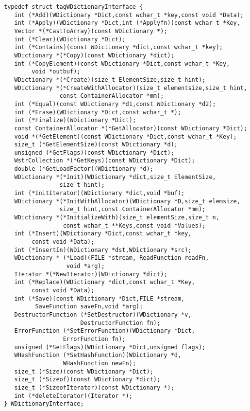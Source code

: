 \begin{verbatim}
typedef struct tagWDictionaryInterface {
   int (*Add)(WDictionary *Dict,const wchar_t *key,const void *Data);
   int (*Apply)(WDictionary *Dict,int (*Applyfn)(const wchar_t *Key,
   Vector *(*CastToArray)(const WDictionary *);
   int (*Clear)(WDictionary *Dict);
   int (*Contains)(const WDictionary *dict,const wchar_t *key);
   WDictionary *(*Copy)(const WDictionary *dict);
   int (*CopyElement)(const WDictionary *Dict,const wchar_t *Key,
        void *outbuf);
   WDictionary *(*Create)(size_t ElementSize,size_t hint);
   WDictionary *(*CreateWithAllocator)(size_t elementsize,size_t hint,
                const ContainerAllocator *mm);
   int (*Equal)(const WDictionary *d1,const WDictionary *d2);
   int (*Erase)(WDictionary *Dict,const wchar_t *);
   int (*Finalize)(WDictionary *Dict);
   const ContainerAllocator *(*GetAllocator)(const WDictionary *Dict);
   void *(*GetElement)(const WDictionary *Dict,const wchar_t *Key);
   size_t (*GetElementSize)(const WDictionary *d);
   unsigned (*GetFlags)(const WDictionary *Dict);
   WstrCollection *(*GetKeys)(const WDictionary *Dict);
   double (*GetLoadFactor)(WDictionary *d);
   WDictionary *(*Init)(WDictionary *dict,size_t ElementSize,
                size_t hint);
   int (*InitIterator)(WDictionary *dict,void *buf);
   WDictionary *(*InitWithAllocator)(WDictionary *D,size_t elemsize,
                size_t hint,const ContainerAllocator *mm);
   WDictionary *(*InitializeWith)(size_t elementSize,size_t n,
                 const wchar_t **Keys,const void *Values);
   int (*Insert)(WDictionary *Dict,const wchar_t *key,
        const void *Data);
   int (*InsertIn)(WDictionary *dst,WDictionary *src);
   WDictionary * (*Load)(FILE *stream, ReadFunction readFn,
                  void *arg);
   Iterator *(*NewIterator)(WDictionary *dict);
   int (*Replace)(WDictionary *dict,const wchar_t *Key,
        const void *Data);
   int (*Save)(const WDictionary *Dict,FILE *stream,
         SaveFunction saveFn,void *arg);
   DestructorFunction (*SetDestructor)(WDictionary *v,
                      DestructorFunction fn);
   ErrorFunction (*SetErrorFunction)(WDictionary *Dict,
                 ErrorFunction fn);
   unsigned (*SetFlags)(WDictionary *Dict,unsigned flags);
   WHashFunction (*SetHashFunction)(WDictionary *d,
                 WHashFunction newFn);
   size_t (*Size)(const WDictionary *Dict);
   size_t (*Sizeof)(const WDictionary *dict);
   size_t (*SizeofIterator)(const WDictionary *);
   int (*deleteIterator)(Iterator *);
} WDictionaryInterface;
\end{verbatim}
